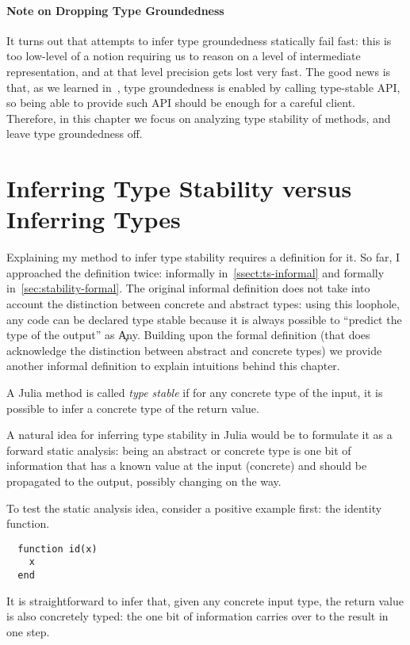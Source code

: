 \paragraph{Note on Dropping Type Groundedness} It turns out that attempts to
infer type groundedness statically fail fast: this is too low-level of a
notion requiring us to reason on a level of intermediate representation, and at
that level precision gets lost very fast. The good news is that, as we learned
in~, type groundedness is enabled by calling type-stable
API, so being able to provide such API should be enough for a careful client.
Therefore, in this chapter we focus on analyzing type stability of methods, and
leave type groundedness off.

\section{Inferring Type Stability versus Inferring Types}

Explaining my method to infer type stability requires a definition for it.
So far, I approached the definition twice: informally
in~\ref{ssect:ts-informal} and formally in~\ref{sec:stability-formal}.
The original informal
definition does not take into account the distinction between concrete and
abstract types: using this loophole, any code can be declared type stable
because it is always possible to ``predict the type of the output'' as \c{Any}.
Building upon the formal definition (that does acknowledge the distinction
between abstract and concrete types)
we provide another informal definition to explain intuitions behind this
chapter.
\begin{definition}
  A Julia method is called \emph{type stable} if for any concrete type of the
  input, it is possible to infer a concrete type of the return value.
\end{definition}

A natural idea for inferring type stability in Julia would be to formulate it as
a forward static analysis: being an abstract or concrete type is one bit of
information that has a known value at the input (concrete) and should be
propagated to the output, possibly changing on the way.

To test the static analysis idea, consider a positive example first: the
identity function.
\begin{lstlisting}
  function id(x)
    x
  end
\end{lstlisting}
%
It is straightforward to infer that, given any concrete input type, the return
value is also concretely typed: the one bit of information carries over to the
result in one step.

